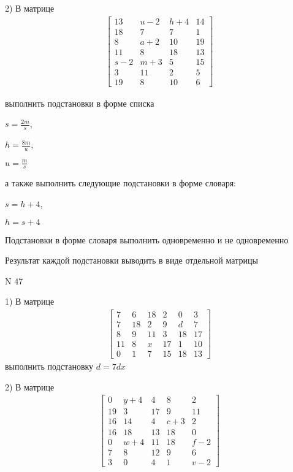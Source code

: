 \documentclass[11pt]{report}
\begin{document}
    2) В матрице
\begin{align*}
\left[\begin{matrix}13 & u - 2 & h + 4 & 14\\18 & 7 & 7 & 1\\8 & a + 2 & 10 & 19\\11 & 8 & 18 & 13\\s - 2 & m + 3 & 5 & 15\\3 & 11 & 2 & 5\\19 & 8 & 10 & 6\end{matrix}\right]
\end{align*}

выполнить подстановки в форме списка

$s=\frac{2 m}{s}$,

$h=\frac{8 m}{u}$,

$u=\frac{m}{s}$

а также выполнить следующие подстановки в форме словаря:

$s=h + 4$,

$h=s + 4$


    Подстановки в форме словаря выполнить одновременно и не одновременно


    Результат каждой подстановки выводить в виде отдельной матрицы

\newpage
N 47


    1) В матрице
\begin{align*}
\left[\begin{matrix}7 & 6 & 18 & 2 & 0 & 3\\7 & 18 & 2 & 9 & d & 7\\8 & 9 & 11 & 3 & 18 & 17\\11 & 8 & x & 17 & 1 & 10\\0 & 1 & 7 & 15 & 18 & 13\end{matrix}\right]
\end{align*}
выполнить подстановку $d=7 d x$


    2) В матрице
\begin{align*}
\left[\begin{matrix}0 & y + 4 & 4 & 8 & 2\\19 & 3 & 17 & 9 & 11\\16 & 14 & 4 & c + 3 & 2\\16 & 18 & 13 & 18 & 0\\0 & w + 4 & 11 & 18 & f - 2\\7 & 8 & 12 & 9 & 6\\3 & 0 & 4 & 1 & v - 2\end{matrix}\right]
\end{align*}
\end{document}
